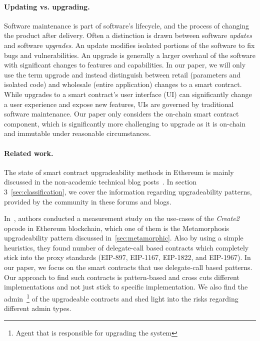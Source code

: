 \paragraph{Updating vs. upgrading.} Software maintenance is part of software's lifecycle, and the process of changing the product after delivery. Often a distinction is drawn between software \textit{updates} and software \textit{upgrades}. An update modifies isolated portions of the software to fix bugs and vulnerabilities. An upgrade is generally a larger overhaul of the software with significant changes to features and capabilities. In our paper, we will only use the term upgrade and instead distinguish between retail (parameters and isolated code) and wholesale (entire application) changes to a smart contract. While upgrades to a smart contract's user interface (UI) can significantly change a user experience and expose new features, UIs are governed by traditional software maintenance. Our paper only considers the on-chain smart contract component, which is significantly more challenging to upgrade as it is on-chain and immutable under reasonable circumstances. 

\paragraph{Related work.} 

The state of smart contract upgradeability methods in Ethereum is mainly discussed in the non-academic technical blog posts~\cite{openzeppelinPost,tobBlogPost}. In section 3~\ref{sec:classification}, we cover the information regarding upgradeability patterns, provided by the community in these forums and blogs.

In~\cite{frowisnot}, authors conducted a measurement study on the use-cases of the \textit{Create2} opcode in Ethereum blockchain, which one of them is the Metamorphosis upgradeability pattern discussed in~\ref{sec:metamorphic}. Also by using a simple heuristics, they found number of delegate-call based contracts which completely stick into the proxy standards (EIP-897, EIP-1167, EIP-1822, and EIP-1967). In our paper, we focus on the smart contracts that use delegate-call based patterns. Our approach to find such contracts is pattern-based and cross cuts different implementations and not just stick to specific implementation. We also find the admin~\footnote{Agent that is responsible for upgrading the system} of the upgradeable contracts and shed light into the risks regarding different admin types.

